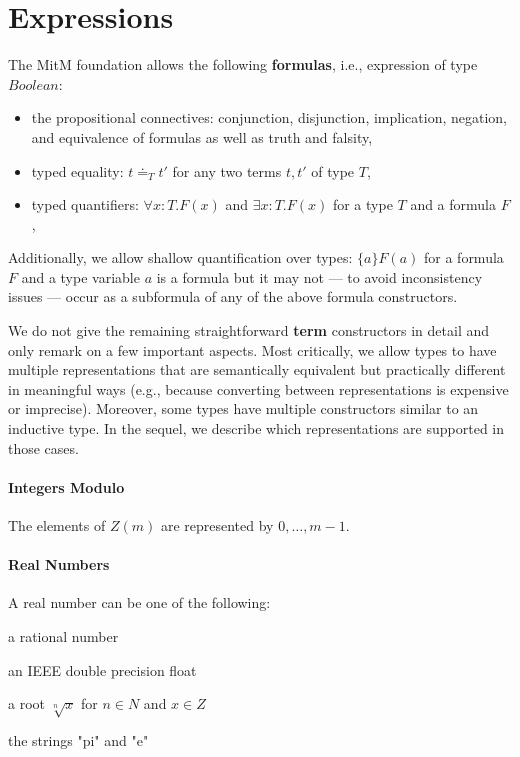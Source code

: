 \section{Expressions}\label{app:expr}

The MitM foundation allows the following \textbf{formulas}, i.e., expression of type $Boolean$:
\begin{itemize}
\item the propositional connectives: conjunction, disjunction, implication, negation, and equivalence of formulas as well as truth and falsity,
\item typed equality: $t\doteq_T t'$ for any two terms $t,t'$ of type $T$,
\item typed quantifiers: $\forall x:T.F(x)$ and $\exists x:T.F(x)$ for a type $T$ and a formula $F$,
\end{itemize}
Additionally, we allow shallow quantification over types: $\{a\}F(a)$ for a formula $F$ and a type variable $a$ is a formula but it may not --- to avoid inconsistency issues --- occur as a subformula of any of the above formula constructors.

We do not give the remaining straightforward \textbf{term} constructors in detail and only remark on a few important aspects.
Most critically, we allow types to have multiple representations that are semantically
equivalent but practically different in meaningful ways (e.g., because converting between
representations is expensive or imprecise). Moreover, some types have multiple constructors similar to an inductive type. In the sequel, we describe which representations are supported in those cases.

\paragraph{Integers Modulo}
The elements of $Z(m)$ are represented by $0,\ldots,m-1$.

\paragraph{Real Numbers}
A real number can be one of the following:
\begin{compactitem}
 \item a rational number
 \item an IEEE double precision float
 \item a root $\sqrt[n]{x}$ for $n\in N$ and $x\in Z$
 \item the strings "pi" and "e"
\end{compactitem}

